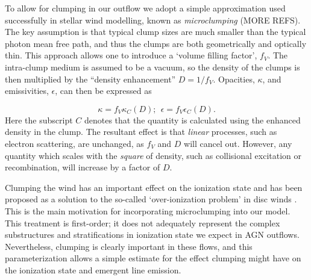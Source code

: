 \documentclass[useAMS,usenatbib]{mn2e_x}
\begin{document}
To allow for clumping in our outflow we adopt a simple approximation
used successfully in stellar wind modelling, known as 
{\em microclumping} \citep{hamann1998,hamann2008}(MORE REFS). 
The key assumption is that typical clump sizes are much smaller than the 
typical photon mean free path, and thus the clumps are 
both geometrically and optically thin. This approach 
allows one to introduce a `volume filling factor', $f_V$. 
The intra-clump medium is assumed to be a vacuum, so the 
density of the clumps is then multiplied by the ``density enhancement'' 
$D=1/f_V$. Opacities, $\kappa$, and emissivities, $\epsilon$, 
can then be expressed as 

\begin{equation}
\kappa = f_V \kappa_C(D);~~\epsilon = f_V \epsilon_C(D).
\end{equation}
Here the subscript $C$ denotes that the quantity is calculated using the 
enhanced density in the clump. The resultant effect is that {\em linear} processes,
such as electron scattering, are unchanged, as $f_V$ and $D$ will cancel out. 
However, any quantity which scales with the {\em square} of density, 
such as collisional excitation or recombination, will increase by a factor of $D$.


Clumping the wind has an important effect on the ionization state and has
been proposed as a solution to the so-called `over-ionization problem' in 
disc winds \citep{hamann2013}. This is the main motivation for incorporating microclumping
into our model. This treatment is first-order; it does not adequately
represent the complex substructures and stratifications in ionization
state we expect in AGN outflows. Nevertheless, clumping is clearly
important in these flows, and this parameterization allows a simple estimate
for the effect clumping might have on the ionization state and emergent 
line emission. 
\end{document}
